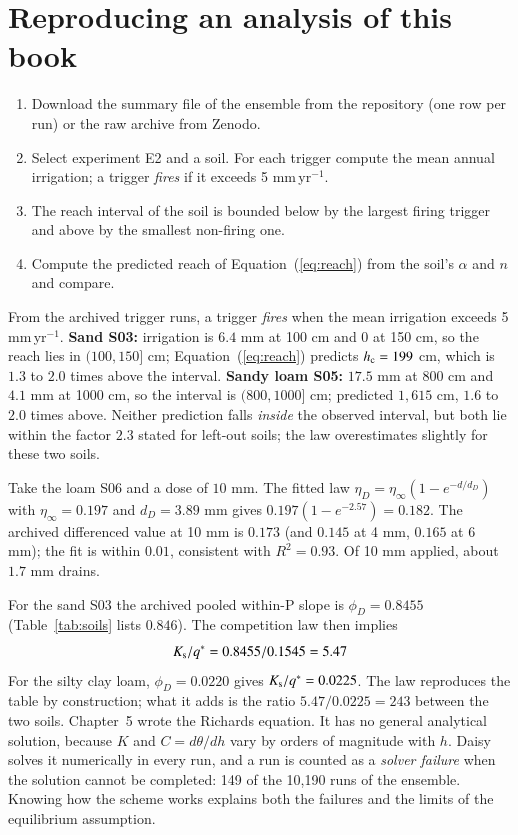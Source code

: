\section{Reproducing an analysis of this book}
\begin{enumerate}[leftmargin=*]
\item Download the summary file of the ensemble from the repository (one row per run) or the raw archive from Zenodo.
\item Select experiment E2 and a soil. For each trigger compute the mean annual irrigation; a trigger \emph{fires} if it exceeds 5 mm\,yr$^{-1}$.
\item The reach interval of the soil is bounded below by the largest firing trigger and above by the smallest non-firing one.
\item Compute the predicted reach of Equation~(\ref{eq:reach}) from the soil's $\alpha$ and $n$ and compare.
\end{enumerate}
\sol  From the archived trigger runs, a trigger \emph{fires} when the mean irrigation exceeds 5 mm\,yr$^{-1}$. \textbf{Sand S03:} irrigation is $6.4$ mm at 100 cm and $0$ at 150 cm, so the reach lies in $(100,150]$ cm; Equation~(\ref{eq:reach}) predicts $h_{\mathrm c}=199$ cm, which is $1.3$ to $2.0$ times above the interval. \textbf{Sandy loam S05:} $17.5$ mm at 800 cm and $4.1$ mm at 1000 cm, so the interval is $(800,1000]$ cm; predicted $1{,}615$ cm, $1.6$ to $2.0$ times above. Neither prediction falls \emph{inside} the observed interval, but both lie within the factor $2.3$ stated for left-out soils; the law overestimates slightly for these two soils. \finans

\sol  Take the loam S06 and a dose of $10$ mm. The fitted law $\eta_D=\eta_\infty(1-e^{-d/d_D})$ with $\eta_\infty=0.197$ and $d_D=3.89$ mm gives $0.197(1-e^{-2.57})=0.182$. The archived differenced value at 10 mm is $0.173$ (and $0.145$ at 4 mm, $0.165$ at 6 mm); the fit is within $0.01$, consistent with $R^2=0.93$. Of 10 mm applied, about $1.7$ mm drains. \finans

\sol  For the sand S03 the archived pooled within-P slope is $\phi_D=0.8455$ (Table~\ref{tab:soils} lists $0.846$). The competition law then implies \[K_{\mathrm s}/q^*=0.8455/0.1545=5.47\]
For the silty clay loam, $\phi_D=0.0220$ gives $K_{\mathrm s}/q^*=0.0225$. The law reproduces the table by construction; what it adds is the ratio $5.47/0.0225=243$ between the two soils.
\label{ch:rich}
Chapter~5 wrote the Richards equation. It has no general analytical solution, because $K$ and $C=d\theta/dh$ vary by orders of magnitude with $h$. Daisy solves it numerically in every run, and a run is counted as a \emph{solver failure} when the solution cannot be completed: 149 of the 10,190 runs of the ensemble. Knowing how the scheme works explains both the failures and the limits of the equilibrium assumption. \finans

